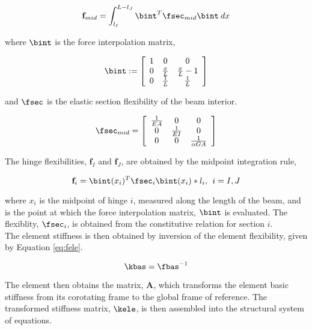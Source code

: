 \begin{equation}
\mathbf{f}_{mid} = \int_{l_I}^{L-l_J}{\bint^T \fsec_{mid} \bint \: dx}
\end{equation}

where $\bint$ is the force interpolation matrix,

\begin{equation}
\bint := \left[
   \begin{array}{c c c}
      1 &           0 &               0 \\
      0 & \frac{x}{L} & \frac{x}{L} - 1 \\
      0 & \frac{1}{L} &     \frac{1}{L}
   \end{array} 
 \right]
\end{equation}

and $\fsec$ is the elastic section flexibility of the beam interior.

\begin{equation}
\fsec_{mid} = \left[
   \begin{array}{c c c}
      \frac{1}{EA} &            0 &                   0 \\
                 0 & \frac{1}{EI} &                   0 \\
                 0 &            0 & \frac{1}{\alpha GA}
   \end{array}
 \right]
\end{equation}

The hinge flexibilities, $\mathbf{f}_I$ and $\mathbf{f}_J$, are obtained
by the midpoint integration rule,

\begin{equation}
{\mathbf{f}}_i = \bint(x_i)^T \fsec_i \bint(x_i) * l_i, \:\: i=I,J
\end{equation}

where $x_i$ is the midpoint of hinge $i$, measured along the length of the
beam, and is the point at which the force interpolation matrix, $\bint$
is evaluated.  The flexiblity, $\fsec_i$, is obtained from the
constitutive relation for section $i$. \\

The element stiffness is then obtained by inversion of the element flexibility,
given by Equation \ref{eq:fele}.

\begin{equation}
\label{eq:kele}
\kbas = \fbas^{-1}
\end{equation}

The element then obtains the matrix, $\mathbf{A}$, which transforms the element basic
stiffness from its corotating frame to the global frame of reference.  The transformed
stiffness matrix, $\kele$, is then assembled into the structural system of equations.

